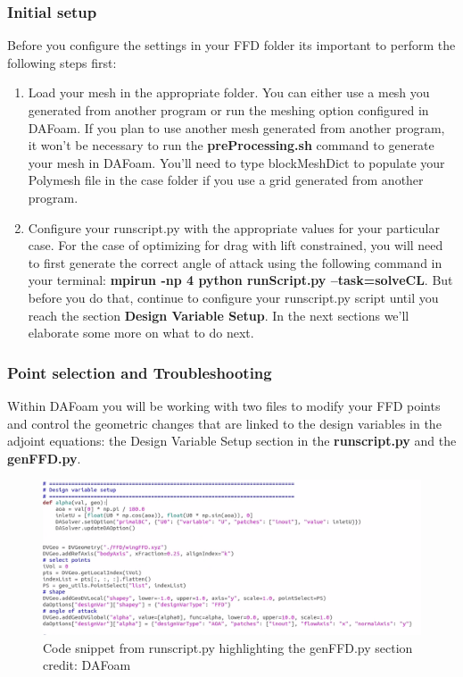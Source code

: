 \documentclass[12pt]{article}
\begin{document}
\subsubsection{Initial setup}
Before you configure the settings in your FFD folder its important to perform the following steps first: 
\begin{enumerate}
    \item Load your mesh in the appropriate folder. You can either use a mesh you generated from another program or run the meshing option configured in DAFoam. If you plan to use another mesh generated from another program, it won't be necessary to run the \textbf{preProcessing.sh} command to generate your mesh in DAFoam. You'll need to type blockMeshDict to populate your Polymesh file in the case folder if you use a grid generated from another program.
    \item Configure your runscript.py with the appropriate values for your particular case. For the case of optimizing for drag with lift constrained, you will need to first generate the correct angle of attack using the following command in your terminal: \textbf{mpirun -np 4 python runScript.py --task=solveCL}. But before you do that, continue to configure your runscript.py script until you reach the section \textbf{Design Variable Setup}. In the next sections we'll elaborate some more on what to do next. 
\end{enumerate}

\subsubsection{Point selection and Troubleshooting}

Within DAFoam you will be working with two files to modify your FFD points and control the geometric changes that are linked to the design variables in the adjoint equations: the Design Variable Setup section in the \textbf{runscript.py} and the \textbf{genFFD.py}.\vspace{4mm}


\begin{figure}[ht]
    \centering
    \includegraphics[width=1\textwidth]{FFDcodeshot.PNG}
    \caption{Code snippet from runscript.py highlighting the genFFD.py section credit: DAFoam}
    \label{fig:my_label}
\end{figure}
\end{document}
